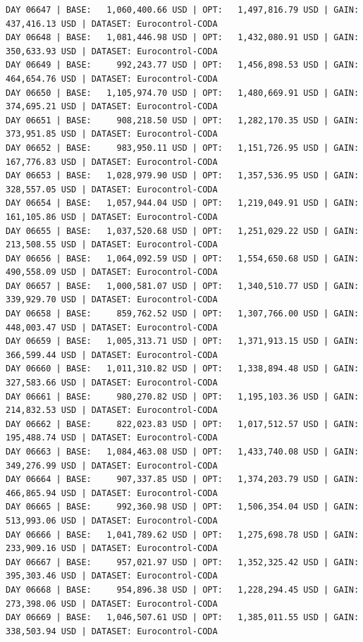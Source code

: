 \documentclass[11pt,a4paper]{article}
\begin{document}
\begin{verbatim}
DAY 06647 | BASE:   1,060,400.66 USD | OPT:   1,497,816.79 USD | GAIN: 437,416.13 USD | DATASET: Eurocontrol-CODA
DAY 06648 | BASE:   1,081,446.98 USD | OPT:   1,432,080.91 USD | GAIN: 350,633.93 USD | DATASET: Eurocontrol-CODA
DAY 06649 | BASE:     992,243.77 USD | OPT:   1,456,898.53 USD | GAIN: 464,654.76 USD | DATASET: Eurocontrol-CODA
DAY 06650 | BASE:   1,105,974.70 USD | OPT:   1,480,669.91 USD | GAIN: 374,695.21 USD | DATASET: Eurocontrol-CODA
DAY 06651 | BASE:     908,218.50 USD | OPT:   1,282,170.35 USD | GAIN: 373,951.85 USD | DATASET: Eurocontrol-CODA
DAY 06652 | BASE:     983,950.11 USD | OPT:   1,151,726.95 USD | GAIN: 167,776.83 USD | DATASET: Eurocontrol-CODA
DAY 06653 | BASE:   1,028,979.90 USD | OPT:   1,357,536.95 USD | GAIN: 328,557.05 USD | DATASET: Eurocontrol-CODA
DAY 06654 | BASE:   1,057,944.04 USD | OPT:   1,219,049.91 USD | GAIN: 161,105.86 USD | DATASET: Eurocontrol-CODA
DAY 06655 | BASE:   1,037,520.68 USD | OPT:   1,251,029.22 USD | GAIN: 213,508.55 USD | DATASET: Eurocontrol-CODA
DAY 06656 | BASE:   1,064,092.59 USD | OPT:   1,554,650.68 USD | GAIN: 490,558.09 USD | DATASET: Eurocontrol-CODA
DAY 06657 | BASE:   1,000,581.07 USD | OPT:   1,340,510.77 USD | GAIN: 339,929.70 USD | DATASET: Eurocontrol-CODA
DAY 06658 | BASE:     859,762.52 USD | OPT:   1,307,766.00 USD | GAIN: 448,003.47 USD | DATASET: Eurocontrol-CODA
DAY 06659 | BASE:   1,005,313.71 USD | OPT:   1,371,913.15 USD | GAIN: 366,599.44 USD | DATASET: Eurocontrol-CODA
DAY 06660 | BASE:   1,011,310.82 USD | OPT:   1,338,894.48 USD | GAIN: 327,583.66 USD | DATASET: Eurocontrol-CODA
DAY 06661 | BASE:     980,270.82 USD | OPT:   1,195,103.36 USD | GAIN: 214,832.53 USD | DATASET: Eurocontrol-CODA
DAY 06662 | BASE:     822,023.83 USD | OPT:   1,017,512.57 USD | GAIN: 195,488.74 USD | DATASET: Eurocontrol-CODA
DAY 06663 | BASE:   1,084,463.08 USD | OPT:   1,433,740.08 USD | GAIN: 349,276.99 USD | DATASET: Eurocontrol-CODA
DAY 06664 | BASE:     907,337.85 USD | OPT:   1,374,203.79 USD | GAIN: 466,865.94 USD | DATASET: Eurocontrol-CODA
DAY 06665 | BASE:     992,360.98 USD | OPT:   1,506,354.04 USD | GAIN: 513,993.06 USD | DATASET: Eurocontrol-CODA
DAY 06666 | BASE:   1,041,789.62 USD | OPT:   1,275,698.78 USD | GAIN: 233,909.16 USD | DATASET: Eurocontrol-CODA
DAY 06667 | BASE:     957,021.97 USD | OPT:   1,352,325.42 USD | GAIN: 395,303.46 USD | DATASET: Eurocontrol-CODA
DAY 06668 | BASE:     954,896.38 USD | OPT:   1,228,294.45 USD | GAIN: 273,398.06 USD | DATASET: Eurocontrol-CODA
DAY 06669 | BASE:   1,046,507.61 USD | OPT:   1,385,011.55 USD | GAIN: 338,503.94 USD | DATASET: Eurocontrol-CODA

\end{verbatim}
\end{document}
